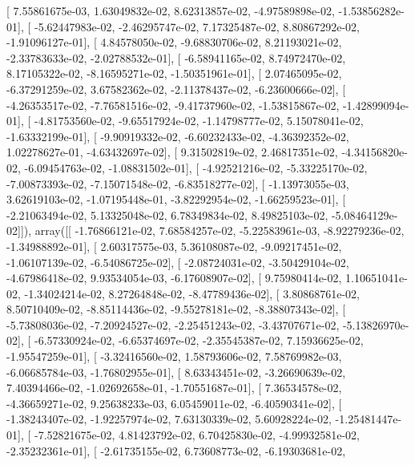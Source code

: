\documentclass{article}
\begin{document}
       [  7.55861675e-03,   1.63049832e-02,   8.62313857e-02,
         -4.97589898e-02,  -1.53856282e-01],
       [ -5.62447983e-02,  -2.46295747e-02,   7.17325487e-02,
          8.80867292e-02,  -1.91096127e-01],
       [  4.84578050e-02,  -9.68830706e-02,   8.21193021e-02,
         -2.33783633e-02,  -2.02788532e-01],
       [ -6.58941165e-02,   8.74972470e-02,   8.17105322e-02,
         -8.16595271e-02,  -1.50351961e-01],
       [  2.07465095e-02,  -6.37291259e-02,   3.67582362e-02,
         -2.11378437e-02,  -6.23600666e-02],
       [ -4.26353517e-02,  -7.76581516e-02,  -9.41737960e-02,
         -1.53815867e-02,  -1.42899094e-01],
       [ -4.81753560e-02,  -9.65517924e-02,  -1.14798777e-02,
          5.15078041e-02,  -1.63332199e-01],
       [ -9.90919332e-02,  -6.60232433e-02,  -4.36392352e-02,
          1.02278627e-01,  -4.63432697e-02],
       [  9.31502819e-02,   2.46817351e-02,  -4.34156820e-02,
         -6.09454763e-02,  -1.08831502e-01],
       [ -4.92521216e-02,  -5.33225170e-02,  -7.00873393e-02,
         -7.15071548e-02,  -6.83518277e-02],
       [ -1.13973055e-03,   3.62619103e-02,  -1.07195448e-01,
         -3.82292954e-02,  -1.66259523e-01],
       [ -2.21063494e-02,   5.13325048e-02,   6.78349834e-02,
          8.49825103e-02,  -5.08464129e-02]]), array([[ -1.76866121e-02,   7.68584257e-02,  -5.22583961e-03,
         -8.92279236e-02,  -1.34988892e-01],
       [  2.60317575e-03,   5.36108087e-02,  -9.09217451e-02,
         -1.06107139e-02,  -6.54086725e-02],
       [ -2.08724031e-02,  -3.50429104e-02,  -4.67986418e-02,
          9.93534054e-03,  -6.17608907e-02],
       [  9.75980414e-02,   1.10651041e-02,  -1.34024214e-02,
          8.27264848e-02,  -8.47789436e-02],
       [  3.80868761e-02,   8.50710409e-02,  -8.85114436e-02,
         -9.55278181e-02,  -8.38807343e-02],
       [ -5.73808036e-02,  -7.20924527e-02,  -2.25451243e-02,
         -3.43707671e-02,  -5.13826970e-02],
       [ -6.57330924e-02,  -6.65374697e-02,  -2.35545387e-02,
          7.15936625e-02,  -1.95547259e-01],
       [ -3.32416560e-02,   1.58793606e-02,   7.58769982e-03,
         -6.06685784e-03,  -1.76802955e-01],
       [  8.63343451e-02,  -3.26690639e-02,   7.40394466e-02,
         -1.02692658e-01,  -1.70551687e-01],
       [  7.36534578e-02,  -4.36659271e-02,   9.25638233e-03,
          6.05459011e-02,  -6.40590341e-02],
       [ -1.38243407e-02,  -1.92257974e-02,   7.63130339e-02,
          5.60928224e-02,  -1.25481447e-01],
       [ -7.52821675e-02,   4.81423792e-02,   6.70425830e-02,
         -4.99932581e-02,  -2.35232361e-01],
       [ -2.61735155e-02,   6.73608773e-02,  -6.19303681e-02,
\end{document}
